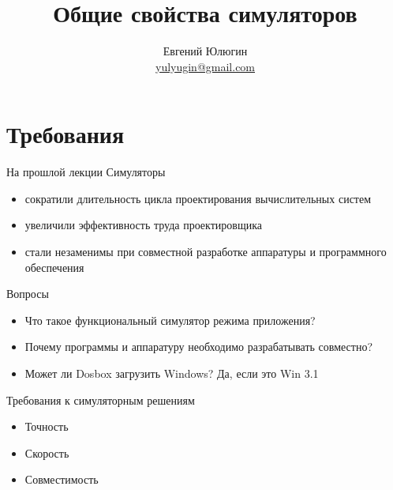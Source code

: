 

\title{Общие свойства симуляторов}
\author[Евгений Юлюгин]{Евгений Юлюгин \\ \small{\href{mailto:yulyugin@gmail.com}{yulyugin@gmail.com}}}



\begin{frame}
    \maketitle
\end{frame}

\begin{frame}
    \tableofcontents
\end{frame}

\section{Требования}

\begin{frame}{На прошлой лекции}
Симуляторы
\begin{itemize}
\item сократили длительность цикла проектирования вычислительных систем
\item увеличили эффективность труда проектировщика
\item стали незаменимы при совместной разработке аппаратуры и программного обеспечения
\end{itemize}
\end{frame}

\begin{frame}{Вопросы}
\begin{itemize}
\item Что такое функциональный симулятор режима приложения?\pause 
\item Почему программы и аппаратуру необходимо разрабатывать совместно?\pause
\item Может ли Dosbox загрузить Windows? \pause Да, если это Win 3.1
\end{itemize}
\end{frame}


\begin{frame}{Требования к симуляторным решениям}
\begin{itemize}
\item Точность
\item Скорость
\item Совместимость
\end{itemize}
\end{frame}

